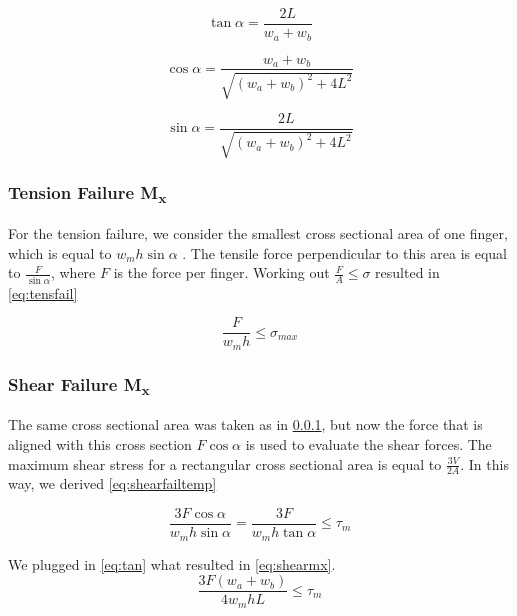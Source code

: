 \begin{equation}
	\label{eq:tan}
	\tan \alpha = \frac{2L}{w_a + w_b}
\end{equation}

\begin{equation}
	\label{eq:cos}
	\cos \alpha = \frac{w_a + w_b}{\sqrt{ \left( w_a + w_b \right) ^2 + 4L ^2 }}
\end{equation}

\begin{equation}
	\label{eq:sin}
	\sin \alpha = \frac{2L}{\sqrt{ \left( w_a + w_b \right) ^2 + 4L ^2 }}
\end{equation}


\subsubsection{Tension Failure M\textsubscript{x}}\label{ssec:tensfail}
For the tension failure, we consider the smallest cross sectional area of one finger, which is equal to $w_m h \sin \alpha$ . 
The tensile force perpendicular to this area is equal to $\frac{F}{\sin \alpha}$, where $F$ is the force per finger. 
Working out $\frac{F}{A} \le \sigma$ resulted in \cref{eq:tensfail}


\begin{equation}
	\label{eq:tensfail}
	\frac{F}{w_m  h} \le \sigma_{max}
\end{equation}


\subsubsection{Shear Failure M\textsubscript{x}}
The same cross sectional area was taken as in \cref{ssec:tensfail}, but now the force that is aligned with this cross section $F \cos \alpha$ is used to evaluate the shear forces. 
The maximum shear stress for a rectangular cross sectional area is equal to $\frac{3V}{2A}$. 
In this way, we derived \cref{eq:shearfailtemp}

\begin{equation}
	\label{eq:shearfailtemp}
	\frac{3F \cos \alpha}{w_m h \sin \alpha} = \frac{3F }{w_m h \tan \alpha} \le \tau_m
\end{equation}

We plugged in \cref{eq:tan} what resulted in \cref{eq:shearmx}.
\begin{equation}
	\label{eq:shearmx}
	\frac{ 3 F \left(w_a + w_b \right) }{ 4  w_m h L} \le \tau_m	
\end{equation}

